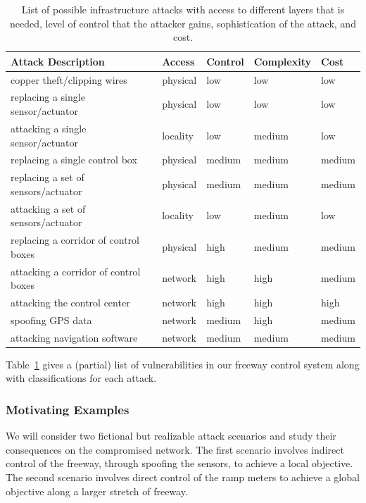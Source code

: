 \begin{table}[t]
\centering
\begin{tabular}{p{6cm}llll}
Attack Description & Access & Control & Complexity & Cost \\
\hline
copper theft/clipping wires & physical & low & low & low \\
replacing a single sensor/actuator & physical & low & low & low \\
attacking a single sensor/actuator & locality & low & medium & low \\
replacing a single control box & physical & medium & medium & medium \\
replacing a set of sensors/actuator & physical & medium & medium & medium \\
attacking a set of sensors/actuator & locality & low & medium & low \\
replacing a corridor of control boxes & physical & high & medium & medium \\
attacking a corridor of control boxes & network & high & high & medium \\
attacking the control center & network & high & high & high \\
spoofing GPS data & network & medium & high & medium \\
attacking navigation software & network & medium & medium & medium \\
\end{tabular}
\caption{List of possible infrastructure attacks with access to different layers
that is needed, level of control that the attacker gains, sophistication of the attack, and cost.\label{table:attacks}}
\end{table}

Table~\ref{table:attacks} gives a (partial) list of vulnerabilities in our freeway control system along with classifications for each attack.

\subsubsection{Motivating Examples}

We will consider two fictional but realizable attack scenarios and study their consequences on the compromised network. The first scenario involves indirect control of the freeway, through spoofing the sensors, to achieve a local objective. The second scenario involves direct control of the ramp meters to achieve a global objective along a larger stretch of freeway. 

